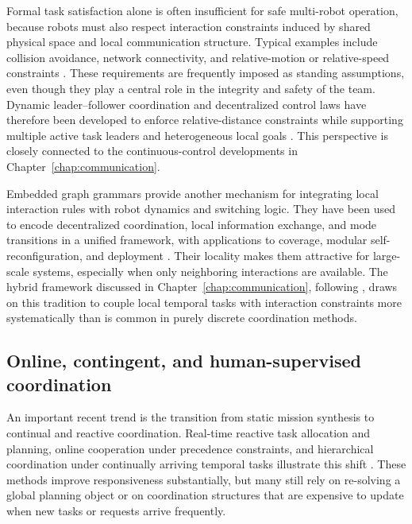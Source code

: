 Formal task satisfaction alone is often insufficient for safe multi-robot
operation, because robots must also respect interaction constraints induced by
shared physical space and local communication structure. Typical examples include
collision avoidance, network connectivity, and relative-motion or relative-speed
constraints \cite{dimarogonas2006feedback,ji2007distributed,zavlanos2011graph,
  guo2014controlling}. These requirements are frequently imposed as standing
assumptions, even though they play a central role in the integrity and safety of
the team. Dynamic leader--follower coordination and decentralized control laws
have therefore been developed to enforce relative-distance constraints while
supporting multiple active task leaders and heterogeneous local goals
\cite{guo2014cooperative,guo2015hybrid,guo2015communication,kloetzer2011multi}.
This perspective is closely connected to the continuous-control developments in
Chapter~\ref{chap:communication}.

Embedded graph grammars provide another mechanism for integrating local
interaction rules with robot dynamics and switching logic. They have been used to
encode decentralized coordination, local information exchange, and mode
transitions in a unified framework, with applications to coverage, modular
self-reconfiguration, and deployment
\cite{mcnew2006locally,mcnew2007solving,pickem2013complete,smith2009multi}.
Their locality makes them attractive for large-scale systems, especially when
only neighboring interactions are available. The hybrid framework discussed in
Chapter~\ref{chap:communication}, following \cite{guo2016hybrid}, draws on this
tradition to couple local temporal tasks with interaction constraints more
systematically than is common in purely discrete coordination methods.

\subsection{Online, contingent, and human-supervised coordination}

An important recent trend is the transition from static mission synthesis to
continual and reactive coordination. Real-time reactive task allocation and
planning, online cooperation under precedence constraints, and hierarchical
coordination under continually arriving temporal tasks illustrate this shift
\cite{chen2025real,gosrich2025online,luo2025hulk}. These methods improve
responsiveness substantially, but many still rely on re-solving a global planning
object or on coordination structures that are expensive to update when new tasks
or requests arrive frequently.

